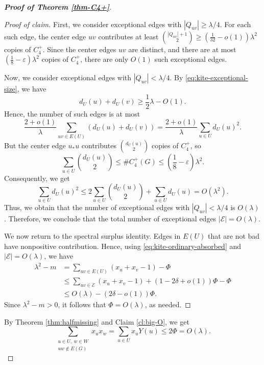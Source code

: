 \documentclass[10pt,a4paper]{amsart}
\renewcommand{\le}{\leqslant}
\renewcommand{\ge}{\geqslant}
\begin{document}
\begin{proof}[{\bf Proof of Theorem \ref{thm-C4+}}]
\begin{proof}[Proof of claim]
First, we consider exceptional edges with \( |Q_{uv}|\ge\lambda/4\).  For each such
edge, the center edge \(uv\) contributes at least
$  {|Q_{uv}|+1\choose2}
        \ge
        \left(\frac1{32}-o(1)\right)\lambda^2$ 
copies of \(C_4^+\).  Since the center edges \(uv\) are distinct, and there are at most $(\frac{1}{8} - \varepsilon)\lambda^2$ copies of $C_4^+$, 
there are
only \(O(1)\) such exceptional edges.

Now, we consider exceptional edges with \(|Q_{uv}| <\lambda/4\).  By
\eqref{eq:kite-exceptional-size}, we have 
\[
        d_U(u)+d_U(v)\ge \frac12\lambda-O(1).
\]
Hence, the number of such edges is at most
\[
        \frac{2+o(1)}{\lambda}
        \sum_{uv\in E(U)}(d_U(u)+d_U(v))
        =
        \frac{2+o(1)}{\lambda}
        \sum_{u\in U}d_U(u)^2.
\]
But the center edge \(u_*u\) contributes \({d_U(u)\choose2}\) copies of
\(C_4^+\), so
\[
        \sum_{u\in U}{d_U(u)\choose2}\le \texttt{\#} C_4^+(G)\le \left(\frac{1}{8} - \varepsilon \right)\lambda^2.
\]
Consequently, we get 
\[
        \sum_{u\in U}d_U(u)^2
        \le
        2\sum_{u\in U}{d_U(u)\choose2} +\sum_{u\in U}d_U(u)
        =  
        O(\lambda^2).
\]
Thus, we obtain that the number of exceptional edges with \(|Q_{uv}| <\lambda/4\) is
\(O(\lambda)\).  Therefore, we conclude that the total number of exceptional edges $ |\mathcal E|=O(\lambda)$. 

We now return to the spectral surplus identity.  Edges in \(E(U)\) that are not
bad have nonpositive contribution.  Hence, using 
\eqref{eq:kite-ordinary-absorbed} and $|\mathcal E| =O(\lambda)$, we have 
\[
\begin{aligned}
        \lambda^2-m
        &=
        \sum_{uv\in E(U)}(x_u+x_v-1)-\Phi                         \\
        &\le
        \sum_{uv\in\mathcal E}(x_u+x_v-1)
        +(1-2\delta+o(1))\Phi-\Phi                                \\
        &\le
        O(\lambda)-(2\delta-o(1))\Phi.
\end{aligned}
\]
Since \(\lambda^2-m>0\), it follows that
$\Phi=O(\lambda)$, as needed. 
\end{proof}

By Theorem \ref{thm:halfmissing} and Claim \ref{cl:big-O}, we get
\begin{equation}\label{eq:kite-missing-Olambda}
        \sum_{\substack{u\in U,\ w\in W\\ uw\notin E(G)}}x_ux_w
        =
        \sum_{u\in U}x_uY(u)
        \le 2\Phi =
        O(\lambda).
\end{equation}



\end{proof}
\end{document}

